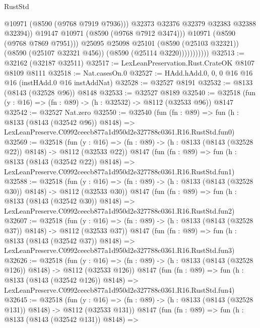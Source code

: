 \begin{lexlean}{RustStd}
\begin{coremodule}
                                @10971
                                (@8590 (@9768 @7919 @7936)))
                              @32373
                              @32376
                              @32379
                              @32383
                              @32388
                              @32394))
                          @19147
                          @10971
                          (@8590 (@9768 @7912 @3474)))
                        @10971
                        (@8590 (@9768 @7869 @7951)))
                      @25095
                      @25098
                      @25101
                      (@8590 (@25103 @32321))
                      (@8590 (@25107 @32321 @456))
                      (@8590 (@25114 @3220)))))))))))
@32513 := @32162 (@32187 @32511)
@32517 := LexLeanPreservation.Rust.CrateOK @8107 @8109 @8111
@32518 := Nat.casesOn.{0}
@32527 := HAdd.hAdd.{0, 0, 0} @16 @16 @16 (instHAdd.{0} @16 instAddNat)
@32528 := @32527 @8191
@32532 := @8133 (@8143 (@32528 @96)) @8148
@32533 := @32527 @8189
@32540 := @32518 (fun (y : @16) => (fn : @89) -> (h : @32532) -> @8112 (@32533 @96)) @8147
@32542 := @32527 Nat.zero
@32550 := @32540
    (fun (fn : @89) =>
    fun (h : @8133 (@8143 (@32542 @96)) @8148) =>
    LexLeanPreserve.C0992ceecb877a1d950d2e327788c0361.R16.RustStd.fun0)
@32569 := @32518
    (fun (y : @16) => (fn : @89) -> (h : @8133 (@8143 (@32528 @22)) @8148) -> @8112 (@32533 @22))
    @8147
    (fun (fn : @89) =>
    fun (h : @8133 (@8143 (@32542 @22)) @8148) =>
    LexLeanPreserve.C0992ceecb877a1d950d2e327788c0361.R16.RustStd.fun1)
@32588 := @32518
    (fun (y : @16) => (fn : @89) -> (h : @8133 (@8143 (@32528 @30)) @8148) -> @8112 (@32533 @30))
    @8147
    (fun (fn : @89) =>
    fun (h : @8133 (@8143 (@32542 @30)) @8148) =>
    LexLeanPreserve.C0992ceecb877a1d950d2e327788c0361.R16.RustStd.fun2)
@32607 := @32518
    (fun (y : @16) => (fn : @89) -> (h : @8133 (@8143 (@32528 @37)) @8148) -> @8112 (@32533 @37))
    @8147
    (fun (fn : @89) =>
    fun (h : @8133 (@8143 (@32542 @37)) @8148) =>
    LexLeanPreserve.C0992ceecb877a1d950d2e327788c0361.R16.RustStd.fun3)
@32626 := @32518
    (fun (y : @16) => (fn : @89) -> (h : @8133 (@8143 (@32528 @126)) @8148) -> @8112 (@32533 @126))
    @8147
    (fun (fn : @89) =>
    fun (h : @8133 (@8143 (@32542 @126)) @8148) =>
    LexLeanPreserve.C0992ceecb877a1d950d2e327788c0361.R16.RustStd.fun4)
@32645 := @32518
    (fun (y : @16) => (fn : @89) -> (h : @8133 (@8143 (@32528 @131)) @8148) -> @8112 (@32533 @131))
    @8147
    (fun (fn : @89) =>
    fun (h : @8133 (@8143 (@32542 @131)) @8148) =>

\end{coremodule}
\end{lexlean}
